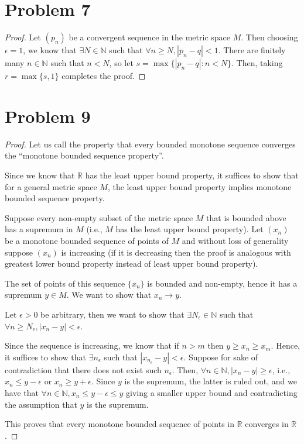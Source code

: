 \documentclass[11pt]{article}
\newcommand{\bbN}{\mathbb{N}}
\newcommand{\bbR}{\mathbb{R}}
\renewcommand{\_}[1]{\underline{ #1 }}
\theoremstyle{definition}
\numberwithin{equation}{subsection}
\begin{document}
\bigskip

\section*{Problem 7}
\begin{proof}
Let $(p_n)$ be a convergent sequence in the metric space $M$. Then choosing $\epsilon =1$, we know that $\exists N \in \mathbb{N}$ such that $\forall n \geq N, |p_n-q|<1$. There are finitely many $ n\in \mathbb{N}$ such that $n<N$, so let $s=\max\{|p_n-q| : n<N\}$. Then, taking $r=\max\{s,1\}$ completes the proof.

\end{proof}

\section*{Problem 9}
\begin{proof}
Let us call the property that every bounded monotone sequence converges the ``monotone bounded sequence property”.

Since we know that $\bbR$ has the least upper bound property, it suffices to show that for a general metric space $M$, the least upper bound property implies monotone bounded sequence property.

Suppose every non-empty subset of the metric space $M$ that is bounded above has a supremum in $M$ (i.e., $M$ has the least upper bound property). Let $(x_n)$ be a monotone bounded sequence of points of $M$ and without loss of generality suppose $(x_n)$ is increasing (if it is decreasing then the proof is analogous with greatest lower bound property instead of least upper bound property). 

The set of points of this sequence $\{x_n\}$ is bounded and non-empty, hence it has a supremum $y\in M$. We want to show that ${x_n} \displaystyle \rightarrow y$. 

Let $\epsilon>0$ be arbitrary, then we want to show that $\exists N_\epsilon \in \bbN$ such that $\forall n \geq N_\epsilon, |x_n-y|<\epsilon$. 

Since the sequence is increasing, we know that if $n>m$ then $y\geq x_n\geq x_m$. Hence, it suffices to show that $\exists n_\epsilon$ such that $|x_{n_\epsilon}-y|<\epsilon$. Suppose for sake of contradiction that there does not exist such $n_\epsilon$. Then, $\forall n\in \bbN, |x_n-y|\geq \epsilon$, i.e., $x_n \leq y-\epsilon$ or $x_n\geq y+\epsilon$. Since $y$ is the supremum, the latter is ruled out, and we have that $\forall n\in \bbN, x_n\leq y-\epsilon\leq y$ giving a smaller upper bound and contradicting the assumption that $y$ is the supremum.

This proves that every monotone bounded sequence of points in $\bbR$ converges in $\bbR$. 

\end{proof}
\end{document}
